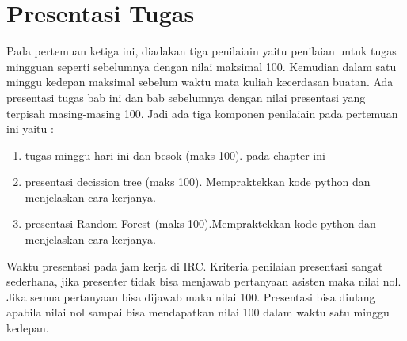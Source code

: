 \section{Presentasi Tugas}
Pada pertemuan ketiga ini, diadakan tiga penilaiain yaitu penilaian untuk tugas mingguan seperti sebelumnya dengan nilai maksimal 100. Kemudian dalam satu minggu kedepan maksimal sebelum waktu mata kuliah kecerdasan buatan. Ada presentasi tugas bab ini dan bab sebelumnya dengan nilai presentasi yang terpisah masing-masing 100. Jadi ada tiga komponen penilaiain pada pertemuan ini yaitu :
\begin{enumerate}
    \item tugas minggu hari ini dan besok (maks 100). pada chapter ini
    \item presentasi decission tree (maks 100). Mempraktekkan kode python dan menjelaskan cara kerjanya.
    \item presentasi Random Forest (maks 100).Mempraktekkan kode python dan menjelaskan cara kerjanya.
\end{enumerate}
Waktu presentasi pada jam kerja di IRC. Kriteria penilaian presentasi sangat sederhana, jika presenter tidak bisa menjawab pertanyaan asisten maka nilai nol. Jika semua pertanyaan bisa dijawab maka nilai 100. Presentasi bisa diulang apabila nilai nol sampai bisa mendapatkan nilai 100 dalam waktu satu minggu kedepan.


